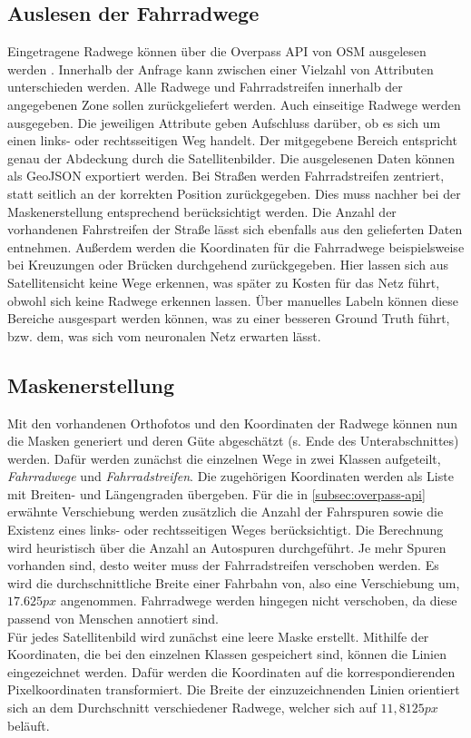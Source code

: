 \subsection{Auslesen der Fahrradwege} \label{subsec:overpass-api}

Eingetragene Radwege können über die Overpass API von \ac{OSM} ausgelesen werden \cite{.05.10.2021}.
Innerhalb der Anfrage kann zwischen einer Vielzahl von Attributen unterschieden werden.
Alle Radwege und Fahrradstreifen innerhalb der angegebenen Zone sollen zurückgeliefert werden.
Auch einseitige Radwege werden ausgegeben. 
Die jeweiligen Attribute geben Aufschluss darüber, ob es sich um einen links- oder rechtsseitigen Weg handelt.
Der mitgegebene Bereich entspricht genau der Abdeckung durch die Satellitenbilder.
Die ausgelesenen Daten können als GeoJSON exportiert werden.
Bei Straßen werden Fahrradstreifen zentriert, statt seitlich an der korrekten Position zurückgegeben.
Dies muss nachher bei der Maskenerstellung entsprechend berücksichtigt werden. Die Anzahl der vorhandenen Fahrstreifen der Straße lässt sich ebenfalls aus den gelieferten Daten entnehmen.
Außerdem werden die Koordinaten für die Fahrradwege beispielsweise bei Kreuzungen oder Brücken durchgehend zurückgegeben. 
Hier lassen sich aus Satellitensicht keine Wege erkennen, was später zu Kosten für das Netz führt, obwohl sich keine Radwege erkennen lassen.
Über manuelles Labeln können diese Bereiche ausgespart werden können, was zu einer besseren Ground Truth führt, bzw. dem, was sich vom neuronalen Netz erwarten lässt.

\subsection{Maskenerstellung}

Mit den vorhandenen Orthofotos und den Koordinaten der Radwege können nun die Masken generiert 
und deren Güte abgeschätzt (s. Ende des Unterabschnittes) werden.
Dafür werden zunächst die einzelnen Wege in zwei Klassen aufgeteilt, \textit{Fahrradwege} und \textit{Fahrradstreifen}.
Die zugehörigen Koordinaten werden als Liste mit Breiten- und Längengraden übergeben.
Für die in \autoref{subsec:overpass-api} erwähnte Verschiebung werden zusätzlich die Anzahl der Fahrspuren sowie die Existenz eines links- oder rechtsseitigen Weges berücksichtigt.
Die Berechnung wird heuristisch über die Anzahl an Autospuren durchgeführt.
Je mehr Spuren vorhanden sind, desto weiter muss der Fahrradstreifen verschoben werden.
Es wird die durchschnittliche Breite einer Fahrbahn von, also eine Verschiebung um, $17.625px$ angenommen.
Fahrradwege werden hingegen nicht verschoben, da diese passend von Menschen annotiert sind.\\
Für jedes Satellitenbild wird zunächst eine leere Maske erstellt.
Mithilfe der Koordinaten, die bei den einzelnen Klassen gespeichert sind, können die Linien eingezeichnet werden.
Dafür werden die Koordinaten auf die korrespondierenden Pixelkoordinaten transformiert.
Die Breite der einzuzeichnenden Linien orientiert sich an dem Durchschnitt verschiedener Radwege, welcher sich auf $11,8125px$ beläuft.

